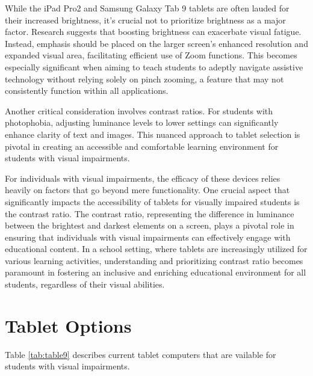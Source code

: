\documentclass[12pt,letterpaper,twoside]{extreport}
\begin{document}
While the iPad Pro2 and Samsung Galaxy Tab 9 tablets are often lauded for their increased brightness, it's crucial not to prioritize brightness as a major factor. Research suggests that boosting brightness can exacerbate visual fatigue. Instead, emphasis should be placed on the larger screen's enhanced resolution and expanded visual area, facilitating efficient use of Zoom functions. This becomes especially significant when aiming to teach students to adeptly navigate assistive technology without relying solely on pinch zooming, a feature that may not consistently function within all applications.

Another critical consideration involves contrast ratios. For students with photophobia, adjusting luminance levels to lower settings can significantly enhance clarity of text and images. This nuanced approach to tablet selection is pivotal in creating an accessible and comfortable learning environment for students with visual impairments.

For individuals with visual impairments, the efficacy of these devices relies heavily on factors that go beyond mere functionality. One crucial aspect that significantly impacts the accessibility of tablets for visually impaired students is the contrast ratio. The contrast ratio, representing the difference in luminance between the brightest and darkest elements on a screen, plays a pivotal role in ensuring that individuals with visual impairments can effectively engage with educational content. In a school setting, where tablets are increasingly utilized for various learning activities, understanding and prioritizing contrast ratio becomes paramount in fostering an inclusive and enriching educational environment for all students, regardless of their visual abilities.


\pagebreak	\hypertarget{tablet-options}{}\section{Tablet Options}\label{tab:tablelet-options}
Table \ref{tab:table9} describes current tablet computers that are vailable for students with visual impairments.
\end{document}
